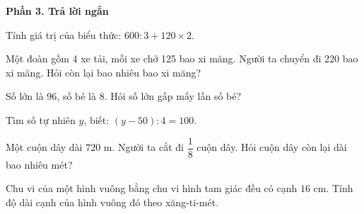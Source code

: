 \textbf{Phần 3. Trả lời ngắn}

\begin{ex} %
Tính giá trị của biểu thức: $600 : 3 + 120 \times 2$.
\end{ex}

\begin{ex} %
Một đoàn gồm 4 xe tải, mỗi xe chở 125 bao xi măng. Người ta chuyển đi 220 bao xi măng. Hỏi còn lại bao nhiêu bao xi măng?
\end{ex}

\begin{ex} %
Số lớn là 96, số bé là 8. Hỏi số lớn gấp mấy lần số bé?
\end{ex}

\begin{ex} %
Tìm số tự nhiên $y$, biết: $(y - 50) : 4 = 100$.
\end{ex}

\begin{ex} %
Một cuộn dây dài $720\text{ m}$. Người ta cắt đi $\dfrac{1}{8}$ cuộn dây. Hỏi cuộn dây còn lại dài bao nhiêu mét?
\end{ex}

\begin{ex} %
Chu vi của một hình vuông bằng chu vi hình tam giác đều có cạnh $16\text{ cm}$. Tính độ dài cạnh của hình vuông đó theo xăng-ti-mét.
\end{ex}
